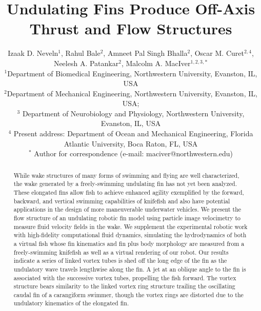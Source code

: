 \documentclass[onecolumn]{IEEEtran}
\begin{document}
\title{Undulating Fins Produce Off-Axis Thrust and Flow Structures}


\author{{Izaak D. Neveln$^{1}$, Rahul Bale$^{2}$, Amneet Pal Singh Bhalla$^{2}$, Oscar M. Curet$^{2,4}$, \\
Neelesh A. Patankar$^{2}$, Malcolm A. MacIver$^{1,2,3,*}$}\\
\normalsize{$^1$Department of Biomedical Engineering, Northwestern University, Evanston, IL, USA}\\
\normalsize{$^2$Department of Mechanical Engineering, Northwestern University, Evanston, IL, USA;}\\
\normalsize{$^3$ Department of Neurobiology and Physiology, Northwestern University, Evanston, IL, USA}\\
\normalsize{$^4$ Present address: Department of Ocean and Mechanical Engineering, Florida Atlantic University, Boca Raton, FL, USA}\\
\normalsize{$^*$ Author for correspondence (e-mail: maciver@northwestern.edu)}}









\maketitle


\begin{abstract}
\noindent
While wake structures of many forms of swimming and flying are well
characterized, the wake generated by a freely-swimming undulating fin has
not yet been analyzed. These elongated fins allow fish to achieve enhanced
agility exemplified by the forward, backward, and vertical swimming
capabilities of knifefish
and also have potential applications in the design of more maneuverable
underwater vehicles. We present the flow structure of an undulating
robotic fin model using particle image velocimetry to measure fluid
velocity fields in the wake. We supplement the experimental robotic work
with high-fidelity computational fluid dynamics, simulating the
hydrodynamics of both a virtual fish whose fin kinematics and fin plus body
morphology are measured from a freely-swimming knifefish as well as a virtual rendering of our robot. Our results
indicate a series of linked vortex tubes is shed off the long edge of the fin as
the undulatory wave travels lengthwise along the fin. A jet at an oblique
angle to the fin is associated with the successive vortex tubes,
propelling the fish forward. The vortex structure bears similarity to the
linked vortex ring structure trailing the oscillating caudal fin of a
carangiform swimmer, though the vortex rings are distorted due to the
undulatory kinematics of the elongated fin.

\end{abstract}
\end{document}
